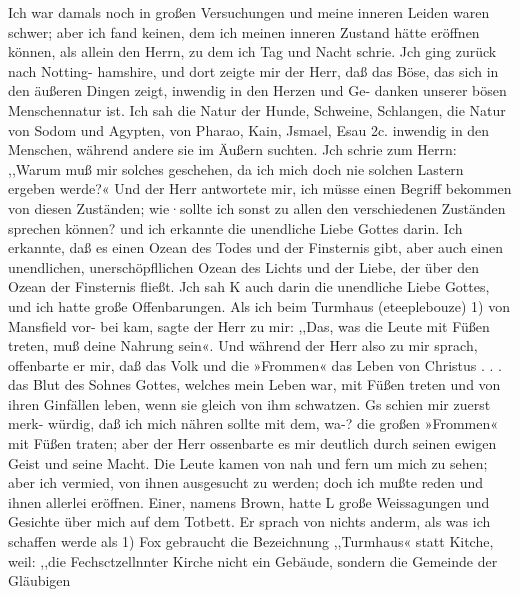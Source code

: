 Ich war damals noch in großen Versuchungen und meine
inneren Leiden waren schwer; aber ich fand keinen, dem ich meinen
inneren Zustand hätte eröffnen können, als allein den Herrn, zu
dem ich Tag und Nacht schrie. Jch ging zurück nach Notting-
hamshire, und dort zeigte mir der Herr, daß das Böse, das sich
in den äußeren Dingen zeigt, inwendig in den Herzen und Ge-
danken unserer bösen Menschennatur ist. Ich sah die Natur der
Hunde, Schweine, Schlangen, die Natur von Sodom und Agypten,
von Pharao, Kain, Jsmael, Esau 2c. inwendig in den Menschen,
während andere sie im Äußern suchten. Jch schrie zum Herrn:
,,Warum muß mir solches geschehen, da ich mich doch nie solchen
Lastern ergeben werde?« Und der Herr antwortete mir, ich
müsse einen Begriff bekommen von diesen Zuständen; wie·sollte
ich sonst zu allen den verschiedenen Zuständen sprechen können?
und ich erkannte die unendliche Liebe Gottes darin. Ich erkannte,
daß es einen Ozean des Todes und der Finsternis gibt, aber
auch einen unendlichen, unerschöpfllichen Ozean des Lichts und
der Liebe, der über den Ozean der Finsternis fließt. Jch sah K
auch darin die unendliche Liebe Gottes, und ich hatte große
Offenbarungen.
Als ich beim Turmhaus (eteeplebouze) 1) von Mansfield vor-
bei kam, sagte der Herr zu mir: ,,Das, was die Leute mit Füßen
treten, muß deine Nahrung sein«. Und während der Herr also
zu mir sprach, offenbarte er mir, daß das Volk und die »Frommen«
das Leben von Christus . . . das Blut des Sohnes Gottes, welches
mein Leben war, mit Füßen treten und von ihren Ginfällen leben,
wenn sie gleich von ihm schwatzen. Gs schien mir zuerst merk-
würdig, daß ich mich nähren sollte mit dem, wa-? die großen
»Frommen« mit Füßen traten; aber der Herr ossenbarte es mir
deutlich durch seinen ewigen Geist und seine Macht.
Die Leute kamen von nah und fern um mich zu sehen;
aber ich vermied, von ihnen ausgesucht zu werden; doch ich mußte
reden und ihnen allerlei eröffnen. Einer, namens Brown, hatte
L große Weissagungen und Gesichte über mich auf dem Totbett.
Er sprach von nichts anderm, als was ich schaffen werde als
1) Fox gebraucht die Bezeichnung ,,Turmhaus« statt Kitche, weil: ,,die
Fechsctzellnnter Kirche nicht ein Gebäude, sondern die Gemeinde der Gläubigen



